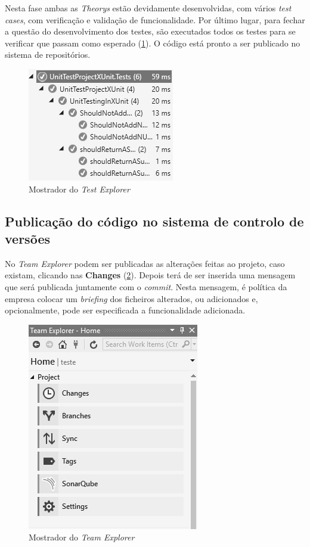 \hspace{1cm}Nesta fase ambas as \textit{Theorys} estão devidamente desenvolvidas, com vários \textit{test cases}, com verificação e validação de funcionalidade. Por último lugar, para fechar a questão do desenvolvimento dos testes, são executados todos os testes para se verificar que passam como esperado (\ref{Fig:Fig24}). O código está pronto a ser publicado no sistema de repositórios.

\begin{figure}[hbt!]
\centering
\includegraphics[width=0.4\linewidth]{Cap5/TestExplorerUnitTestingValidation.png}
\caption{Mostrador do \textit{Test Explorer}}
\label{Fig:Fig24}
\end{figure}

\subsection{Publicação do código no sistema de controlo de versões}

\hspace{1cm}No \textit{Team Explorer} podem ser publicadas as alterações feitas ao projeto, caso existam, clicando nas \textbf{Changes} (\ref{Fig:Fig25}). Depois terá de ser inserida uma mensagem que será publicada juntamente com o \textit{commit}. Nesta mensagem, é política da empresa colocar um \textit{briefing} dos ficheiros alterados, ou adicionados e, opcionalmente, pode ser especificada a funcionalidade adicionada. 

\begin{figure}[hbt!]
\centering
\includegraphics[width=0.4\linewidth]{Cap5/TeamExplorer.png}
\caption{Mostrador do \textit{Team Explorer}}
\label{Fig:Fig25}
\end{figure}

